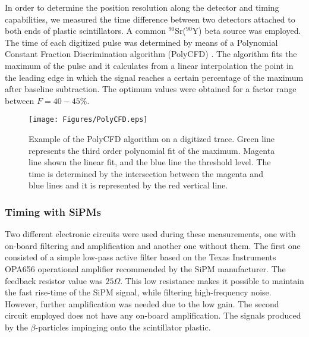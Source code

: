 \documentclass[preprint,3p,twocolumn]{elsarticle}
\begin{document}
In order to determine the position resolution along the detector and timing capabilities, we measured the time difference between two detectors attached to both ends of plastic scintillators. A  common $^{90}$Sr($^{90}$Y) beta source was employed. The time of each digitized pulse was determined by means of a Polynomial Constant Fraction Discrimination  algorithm (PolyCFD) \cite{PhDCory}. The algorithm fits the maximum of the pulse and it calculates from a linear interpolation the point in the leading edge in which the signal reaches a certain percentage of the maximum after baseline subtraction. The optimum values were obtained for a factor range  between $F=40-45\%$.

\begin{figure}[hbt]
\centering
\texttt{[image: Figures/PolyCFD.eps]}
\caption{Example of the PolyCFD algorithm on a digitized trace. Green line represents the third order polynomial fit of the maximum. Magenta line shown the linear fit, and the blue line the threshold level. The time is determined by the intersection between the magenta and blue lines and it is represented by the red vertical line.}
\label{fig:PolyCFD}
\end{figure}



\subsubsection{Timing with SiPMs}
Two different electronic circuits were used during these measurements, one with on-board  filtering and amplification and another one without them. The first one consisted of a simple low-pass active filter based on the Texas Instruments\textsuperscript{\textregistered}   OPA656 operational amplifier recommended by the SiPM manufacturer. The feedback resistor value was $25\Omega$. This low resistance makes it possible to maintain the fast rise-time of the SiPM signal, while filtering high-frequency noise. However, further amplification was needed due to the low gain.  The second circuit employed does not have any on-board amplification. The signals produced by the $\beta$-particles impinging onto the scintillator plastic.
\end{document}
